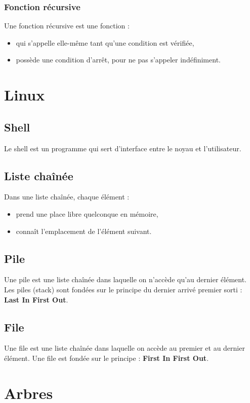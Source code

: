 \documentclass{article}
\begin{document}
\subsubsection{Fonction récursive}
Une fonction récursive est une fonction :
\begin{itemize}
  \item qui s’appelle elle-même tant qu’une condition est vérifiée,
  \item possède une condition d’arrêt, pour ne pas s’appeler indéfiniment.
\end{itemize}

\section{Linux}

\subsection{Shell}
Le shell est un programme qui sert d’interface entre le noyau et l’utilisateur.

\subsection{Liste chaînée}
Dans une liste chaînée, chaque élément :
\begin{itemize}
  \item prend une place libre quelconque en mémoire,
  \item connaît l’emplacement de l’élément suivant.
\end{itemize}

\subsection{Pile}
Une pile est une liste chaînée dans laquelle on n’accède qu’au dernier élément.  
Les piles (stack) sont fondées sur le principe du dernier arrivé premier sorti : \textbf{Last In First Out}.

\subsection{File}
Une file est une liste chaînée dans laquelle on accède au premier et au dernier élément.  
Une file est fondée sur le principe : \textbf{First In First Out}.

\section{Arbres}
\end{document}
